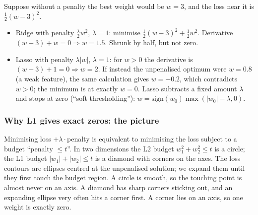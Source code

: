 \begin{example}
Suppose without a penalty the best weight would be $w = 3$, and the loss near it is $\frac12(w-3)^2$.
\begin{itemize}
\item Ridge with penalty $\frac{\lambda}{2}w^2$, $\lambda = 1$: minimise $\frac12(w-3)^2 + \frac12 w^2$. Derivative
  $(w-3) + w = 0 \Rightarrow w = 1.5$. Shrunk by half, but not zero.
\item Lasso with penalty $\lambda|w|$, $\lambda = 1$: for $w>0$ the derivative is $(w-3) + 1 = 0 \Rightarrow w = 2$.
  If instead the unpenalised optimum were $w=0.8$ (a weak feature), the same calculation gives $w = -0.2$,
  which contradicts $w>0$; the minimum is at exactly $w=0$. Lasso subtracts a fixed amount $\lambda$ and stops at
  zero (``soft thresholding''): $w = \text{sign}(w_0)\max(|w_0| - \lambda, 0)$.
\end{itemize}
\end{example}

\subsubsection{Why L1 gives exact zeros: the picture}
Minimising loss $+\lambda\cdot$penalty is equivalent to minimising the loss subject to a budget
``penalty $\le t$''. In two dimensions the L2 budget $w_1^2 + w_2^2 \le t$ is a circle; the L1 budget
$|w_1|+|w_2| \le t$ is a diamond with corners on the axes. The loss contours are ellipses centred at the
unpenalised solution; we expand them until they first touch the budget region. A circle is smooth, so the
touching point is almost never on an axis. A diamond has sharp corners sticking out, and an expanding
ellipse very often hits a corner first. A corner lies on an axis, so one weight is exactly zero.

\begin{center}
\end{center}

